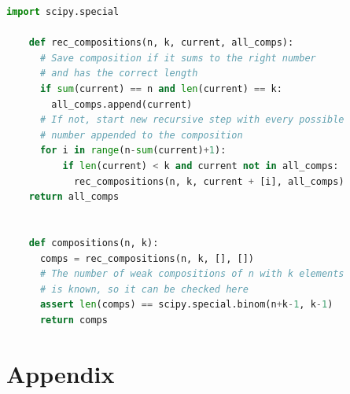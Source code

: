 \documentclass[12pt,letterpaper,oneside,openany]{book}
\begin{document}
\begin{minipage}{\linewidth}
	\begin{lstlisting}[language=Python, caption={Python code to compute the distance matrix of  a set of grade distributions, given as a pandas Series object.}, label={lst:pycomps}, captionpos=b]
	import scipy.special
	
	def rec_compositions(n, k, current, all_comps):
	  # Save composition if it sums to the right number
	  # and has the correct length
	  if sum(current) == n and len(current) == k:
	    all_comps.append(current)
	  # If not, start new recursive step with every possible 
	  # number appended to the composition
	  for i in range(n-sum(current)+1):
		  if len(current) < k and current not in all_comps:
		    rec_compositions(n, k, current + [i], all_comps)
    return all_comps


    def compositions(n, k):
      comps = rec_compositions(n, k, [], [])
      # The number of weak compositions of n with k elements
      # is known, so it can be checked here
      assert len(comps) == scipy.special.binom(n+k-1, k-1)
      return comps
	\end{lstlisting}
\end{minipage}




\clearpage
\appendix
\chapter{Appendix}
\label{ch:appendix}
\end{document}
